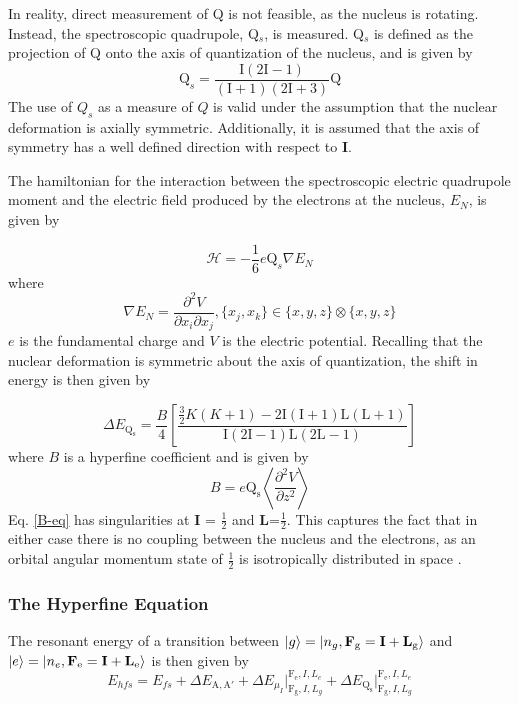In reality, direct measurement of Q is not feasible, as the nucleus is rotating. Instead, the spectroscopic quadrupole, Q$_s$, is measured. Q$_s$ is defined as the projection of Q onto the axis of quantization of the nucleus, and is given by
\begin{equation}
\mathrm{Q}_s = \frac{\mathrm{I}(2\mathrm{I}-1)}{(\mathrm{I}+1)(2\mathrm{I}+3)}\mathrm{Q}
\end{equation}
The use of $Q_s$ as a measure of $Q$ is valid under the assumption that the nuclear deformation is axially symmetric. Additionally, it is assumed that the axis of symmetry has a well defined direction with respect to \textbf{I}.

The hamiltonian for the interaction between the spectroscopic electric quadrupole moment and the electric field produced by the electrons at the nucleus, $E_N$, is given by

\begin{equation}
\mathcal{H} = - \frac{1}{6}e\mathrm{Q}_s\nabla{E_N}
\end{equation}
where
\begin{equation}
\nabla{E_N} = \frac{\partial^2V}{\partial x_i\partial x_j}, \{x_j,x_k\} \in \{x,y,z\} \otimes \{x,y,z\}
\end{equation}
$e$ is the fundamental charge and $V$ is the electric potential. Recalling that the nuclear deformation is symmetric about the axis of quantization, the shift in energy is then given by

\begin{equation}
\Delta E_{\mathrm{Q_s}} = \frac{B}{4}\left[\frac{\frac{3}{2}K(K+1)-2\mathrm{I}(\mathrm{I}+1)\mathrm{L}(\mathrm{L}+1)}{\mathrm{I}(2\mathrm{I}-1)\mathrm{L}(2\mathrm{L}-1)}\right]
\label{B-eq}
\end{equation}
where $B$ is a hyperfine coefficient and is given by
\begin{equation}
B = e\mathrm{Q_s}\left\langle\frac{\partial^2V}{\partial z^2} \right\rangle
\end{equation}
Eq. \ref{B-eq} has singularities at \textbf{I} = $\frac{1}{2}$ and \textbf{L}=$\frac{1}{2}$. This captures the fact that in either case there is no coupling between the nucleus and the electrons, as an orbital angular momentum state of $\frac{1}{2}$ is isotropically distributed in space .

\subsubsection{The Hyperfine Equation}
The resonant energy of a transition between $\ket{g}=\ket{n_g,\mathrm{\textbf{F}_g=\textbf{I} + \textbf{L}_g}}$ and $\ket{e}=\ket{n_e,\mathrm{\textbf{F}_e=\textbf{I} + \textbf{L}_e}}$ is then given by
\begin{equation}
E_{hfs} = E_{fs} +  \Delta E_{\mathrm{A,A'}}+\Delta E_{\mu_I}\Bigr|_{\mathrm{F_g},I,L_g}^{\mathrm{F_e},I,L_e}+\Delta E_{\mathrm{Q_s}}\Bigr|_{\mathrm{F_g},I,L_g}^{\mathrm{F_e},I,L_e}
\end{equation}


